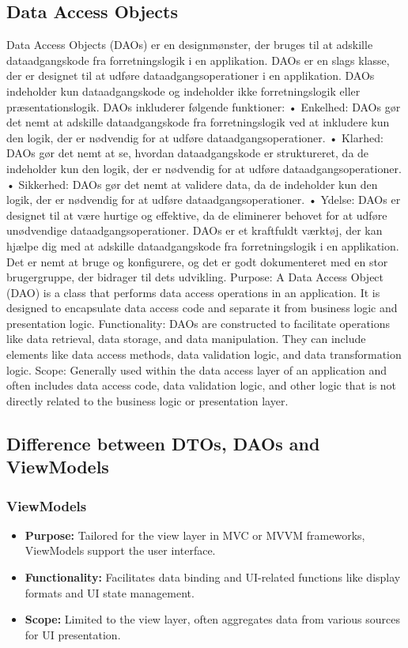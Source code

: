\subsection{Data Access Objects}
Data Access Objects (DAOs) er en designmønster, der bruges til at adskille dataadgangskode fra forretningslogik i en applikation. DAOs er en slags klasse, der er designet til at udføre dataadgangsoperationer i en applikation. 
DAOs indeholder kun dataadgangskode og indeholder ikke forretningslogik eller præsentationslogik.
DAOs inkluderer følgende funktioner:
•	Enkelhed: DAOs gør det nemt at adskille dataadgangskode fra forretningslogik ved at inkludere kun den logik, der er nødvendig for at udføre dataadgangsoperationer.
•	Klarhed: DAOs gør det nemt at se, hvordan dataadgangskode er struktureret, da de indeholder kun den logik, der er nødvendig for at udføre dataadgangsoperationer.
•	Sikkerhed: DAOs gør det nemt at validere data, da de indeholder kun den logik, der er nødvendig for at udføre dataadgangsoperationer.
•	Ydelse: DAOs er designet til at være hurtige og effektive, da de eliminerer behovet for at udføre unødvendige dataadgangsoperationer.
DAOs er et kraftfuldt værktøj, der kan hjælpe dig med at adskille dataadgangskode fra forretningslogik i en applikation. Det er nemt at bruge og konfigurere, og det er godt dokumenteret med en stor brugergruppe, der bidrager til dets udvikling.
Purpose: A Data Access Object (DAO) is a class that performs data access operations in an application. It is designed to encapsulate data access code and separate it from business logic and presentation logic.
Functionality: DAOs are constructed to facilitate operations like data retrieval, data storage, and data manipulation. They can include elements like data access methods, data validation logic, and data transformation logic.
Scope: Generally used within the data access layer of an application and often includes data access code, data validation logic, and other logic that is not directly related to the business logic or presentation layer.

\subsection{Difference between DTOs, DAOs and ViewModels}

\subsubsection{ViewModels}
\begin{itemize}
    \item \textbf{Purpose:} Tailored for the view layer in MVC or MVVM frameworks, ViewModels support the user interface.
    \item \textbf{Functionality:} Facilitates data binding and UI-related functions like display formats and UI state management.
    \item \textbf{Scope:} Limited to the view layer, often aggregates data from various sources for UI presentation.
\end{itemize}

